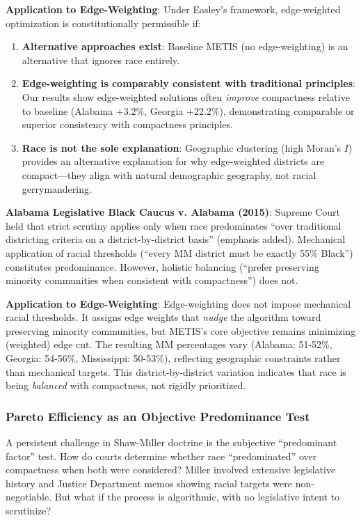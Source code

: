 \textbf{Application to Edge-Weighting}: Under Easley's framework, edge-weighted optimization is constitutionally permissible if:
\begin{enumerate}
    \item \textbf{Alternative approaches exist}: Baseline METIS (no edge-weighting) is an alternative that ignores race entirely.
    \item \textbf{Edge-weighting is comparably consistent with traditional principles}: Our results show edge-weighted solutions often \emph{improve} compactness relative to baseline (Alabama +3.2\%, Georgia +22.2\%), demonstrating comparable or superior consistency with compactness principles.
    \item \textbf{Race is not the sole explanation}: Geographic clustering (high Moran's $I$) provides an alternative explanation for why edge-weighted districts are compact---they align with natural demographic geography, not racial gerrymandering.
\end{enumerate}

\textbf{Alabama Legislative Black Caucus v. Alabama (2015)}: Supreme Court held that strict scrutiny applies only when race predominates ``over traditional districting criteria on a district-by-district basis'' (emphasis added). Mechanical application of racial thresholds (``every MM district must be exactly 55\% Black'') constitutes predominance. However, holistic balancing (``prefer preserving minority communities when consistent with compactness'') does not.

\textbf{Application to Edge-Weighting}: Edge-weighting does not impose mechanical racial thresholds. It assigns edge weights that \emph{nudge} the algorithm toward preserving minority communities, but METIS's core objective remains minimizing (weighted) edge cut. The resulting MM percentages vary (Alabama: 51-52\%, Georgia: 54-56\%, Mississippi: 50-53\%), reflecting geographic constraints rather than mechanical targets. This district-by-district variation indicates that race is being \emph{balanced} with compactness, not rigidly prioritized.

\subsubsection{Pareto Efficiency as an Objective Predominance Test}

A persistent challenge in Shaw-Miller doctrine is the subjective ``predominant factor'' test. How do courts determine whether race ``predominated'' over compactness when both were considered? Miller involved extensive legislative history and Justice Department memos showing racial targets were non-negotiable. But what if the process is algorithmic, with no legislative intent to scrutinize?

